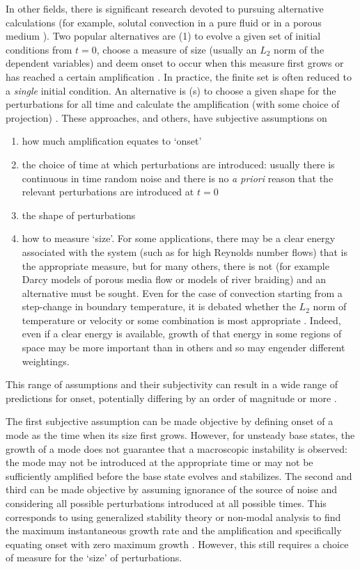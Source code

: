 \documentclass[letterpaper,prl,aps,twocolumn,reprint,superscriptaddress]{revtex4-1}
\begin{document}
In other fields, there is significant research devoted to pursuing alternative calculations (for example, solutal convection in a pure fluid or in a porous medium \cite{references}).  Two popular alternatives are (1) to evolve a given set of initial conditions from $t=0$, choose a measure of size (usually an $L_2$ norm of the dependent variables) and deem onset to occur when this measure first grows or has reached a certain amplification \cite{Foster,GreshoSani,EnnisKingPaterson,more}.  In practice, the finite set is often reduced to a \emph{single} initial condition.  An alternative is (s) to choose a given shape for the perturbations for all time and calculate the amplification (with some choice of projection) \cite{Ben,Riaz,more}.  These approaches, and others, have subjective assumptions on
\begin{enumerate}
\itemsep=0cm
\item how much amplification equates to `onset'
\item the choice of time at which perturbations are introduced: usually there is continuous in time random noise and there is no \emph{a priori} reason that the relevant perturbations are introduced at $t=0$ \cite{GreshoSani}
\item the shape of perturbations
\item how to measure `size'.  For some applications, there may be a clear energy associated with the system (such as for high Reynolds number flows) that is the appropriate measure, but for many others, there is not (for example Darcy models of porous media flow or models of river braiding) and an alternative must be sought.  Even for the case of convection starting from a step-change in boundary temperature, it is debated whether the $L_2$ norm of temperature or velocity or some combination is most appropriate \cite{GreshoSani}.  Indeed, even if a clear energy is available, growth of that energy in some regions of space may be more important than in others and so may engender different weightings.
\end{enumerate}
This range of assumptions and their subjectivity can result in a wide range of predictions for onset, potentially differing by an order of magnitude or more \cite{example}.

The first subjective assumption can be made objective by defining onset of a mode as the time when its size first grows.  However, for unsteady base states, the growth of a mode does not guarantee that a macroscopic instability is observed: the mode may not be introduced at the appropriate time or may not be sufficiently amplified before the base state evolves and stabilizes.  The second and third can be made objective by assuming ignorance of the source of noise and considering all possible perturbations introduced at all possible times.  This corresponds to using generalized stability theory or non-modal analysis to find the maximum instantaneous growth rate and the amplification and specifically equating onset with zero maximum growth \cite{FarrellIoannou,SlimRama10}.  However, this still requires a choice of measure for the `size' of perturbations.
\end{document}
